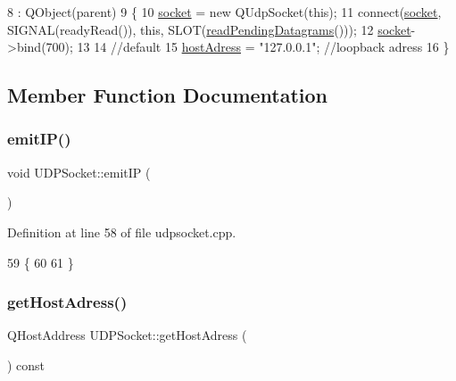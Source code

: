 \begin{DoxyCode}
8                                     : QObject(parent)
9 \{
10     \hyperlink{class_u_d_p_socket_a9d27cb09deee765dfec056cfc774c878}{socket} = \textcolor{keyword}{new} QUdpSocket(\textcolor{keyword}{this});
11     connect(\hyperlink{class_u_d_p_socket_a9d27cb09deee765dfec056cfc774c878}{socket}, SIGNAL(readyRead()), \textcolor{keyword}{this}, SLOT(\hyperlink{class_u_d_p_socket_a927f0446edc240955bea6e6e493e6621}{readPendingDatagrams}()));
12     \hyperlink{class_u_d_p_socket_a9d27cb09deee765dfec056cfc774c878}{socket}->bind(700);
13 
14     \textcolor{comment}{//default}
15     \hyperlink{class_u_d_p_socket_aacd808913633488ab008e8aa7ff8d9cf}{hostAdress} = \textcolor{stringliteral}{"127.0.0.1"}; \textcolor{comment}{//loopback adress}
16 \}
\end{DoxyCode}


\subsection{Member Function Documentation}
\mbox{\label{class_u_d_p_socket_a9cfc381ef8fe97d2adea9eb0d2c2c1f5}} 
\subsubsection{\texorpdfstring{emit\+I\+P()}{emitIP()}}
{\footnotesize\ttfamily void U\+D\+P\+Socket\+::emit\+IP (\begin{DoxyParamCaption}{ }\end{DoxyParamCaption})}



Definition at line 58 of file udpsocket.\+cpp.


\begin{DoxyCode}
59 \{
60 
61 \}
\end{DoxyCode}
\mbox{\label{class_u_d_p_socket_a8d1b7ad860447197ac896f35949aa723}} 
\subsubsection{\texorpdfstring{get\+Host\+Adress()}{getHostAdress()}}
{\footnotesize\ttfamily Q\+Host\+Address U\+D\+P\+Socket\+::get\+Host\+Adress (\begin{DoxyParamCaption}{ }\end{DoxyParamCaption}) const}



